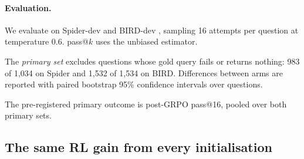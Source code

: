 \paragraph{Evaluation.}
We evaluate on Spider-dev and BIRD-dev \citep{li2023bird}, sampling 16 attempts per question at temperature 0.6. pass@$k$ uses the unbiased estimator.

The \emph{primary set} excludes questions whose gold query fails or returns nothing: 983 of 1,034 on Spider and 1,532 of 1,534 on BIRD. Differences between arms are reported with paired bootstrap 95\% confidence intervals over questions.

The pre-registered primary outcome is post-GRPO pass@16, pooled over both primary sets.

\subsection{The same RL gain from every initialisation}
\label{sec:rl}

\begin{table}[t]
\centering\small
{}
\caption{Main results: pass@$k$ (\%) on the primary sets, with 16 attempts per question. All SFT initialisations are closely matched. After the same GRPO, observation supervision (\armB) does not improve on \armA{}.}
\label{tab:main}
\end{table}



